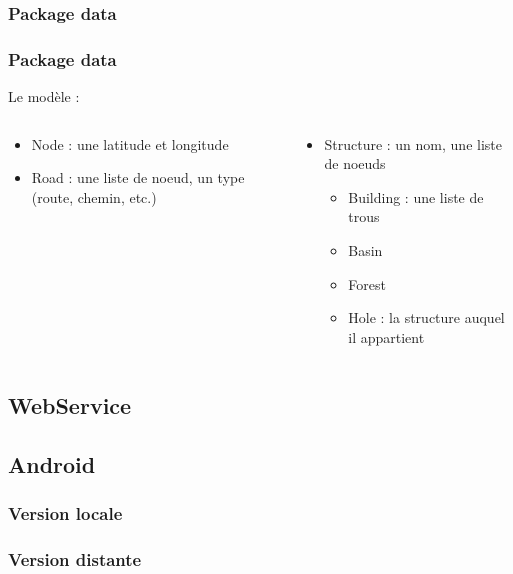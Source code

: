 \documentclass{beamer}
\begin{document}
\subsubsection{Package data}
\begin{frame}
\frametitle{Package data}

Le modèle :\\
\begin{columns}
\begin{column}{.49\textwidth}
\begin{itemize}
\item Node : une latitude et longitude
\item Road : une liste de noeud, un type (route, chemin, etc.)
\end{itemize}
\end{column}
\begin{column}{.49\textwidth}
\begin{itemize}
\item Structure : un nom, une liste de noeuds
\begin{itemize}
\item Building : une liste de trous
\item Basin
\item Forest
\item Hole : la structure auquel il appartient
\end{itemize}
\end{itemize}
\end{column}
\end{columns}

\end{frame}

\subsection{WebService}
\begin{frame}
\end{frame}

\subsection{Android}
\subsubsection{Version locale}
\begin{frame}
\end{frame}
\subsubsection{Version distante}
\begin{frame}
\end{frame}
\end{document}

